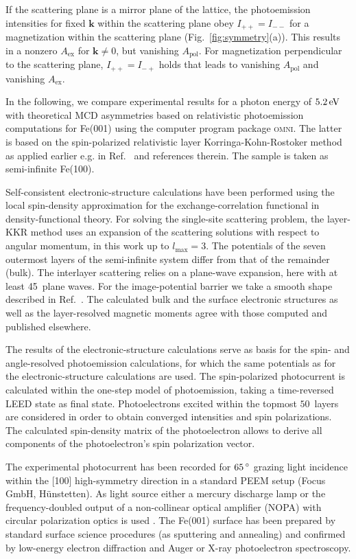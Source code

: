 \documentclass[prl,twocolumn,floatfix,superscriptaddress,aps]{revtex4-2}
\renewcommand{\vec}[1]{\boldsymbol{#1}}
\begin{document}
If the scattering plane is a mirror plane of the lattice, the photoemission intensities for fixed $\vec{k}$ within the scattering plane obey $I_{+ +} = I_{- -}$ for a magnetization within the scattering plane (Fig.~\ref{fig:symmetry}(a)). This results in a nonzero $A_{\mathrm{ex}}$ for $\vec{k}\neq 0$, but vanishing $A_{\mathrm{pol}}$. For magnetization perpendicular to the scattering plane, $I_{+ +} = I_{- +}$ holds that leads to vanishing $A_{\mathrm{pol}}$ and vanishing $A_{\mathrm{ex}}$.
 

In the following, we compare experimental results for a photon energy of $\unit[5.2]{eV}$ with theoretical MCD asymmetries based on relativistic photoemission computations for Fe(001) using the computer program package \textsc{omni}. 
The latter is based on the spin-polarized relativistic layer Korringa-Kohn-Rostoker method as applied earlier e.g. in Ref.~ and references therein. The sample is taken as semi-infinite Fe(100).

Self-consistent electronic-structure calculations have been performed using the local spin-density approximation for the exchange-correlation functional in density-functional theory. For solving the single-site scattering problem, the layer-KKR method uses an expansion of the scattering solutions with respect to angular momentum, in this work up to $l_{\mathrm{max}} = 3$. The potentials of the seven outermost layers of the semi-infinite system differ from that of the remainder (bulk). The interlayer scattering relies on a plane-wave expansion, here with at least 45~plane waves. For the image-potential barrier we take a smooth shape described in Ref.~. The calculated bulk and the surface electronic structures as well as the layer-resolved magnetic moments agree with those computed and published elsewhere. 

The results of the electronic-structure calculations serve as basis for the spin- and angle-resolved photoemission calculations, for which the same potentials as for the electronic-structure calculations are used. The spin-polarized photocurrent is calculated within the one-step model of photoemission, taking a time-reversed LEED state as final state. Photoelectrons excited within the topmost $50$~layers are considered in order to obtain converged intensities and spin polarizations. The calculated spin-density matrix of the photoelectron allows to derive all components of the photoelectron's spin polarization vector.


The experimental photocurrent has been recorded for $\unit[65]{^{\circ}}$ grazing light incidence within the [100] high-symmetry direction in a standard PEEM setup (Focus GmbH, H\"{u}nstetten). As light source either a mercury discharge lamp or the frequency-doubled output of a non-collinear optical amplifier (NOPA) with circular polarization optics is used \cite{duncker2012,gillmeister2020, paleschke2021}. The Fe(001) surface has been prepared by standard surface science procedures (as sputtering and annealing) and confirmed by low-energy electron diffraction and Auger or X-ray photoelectron spectroscopy.
\end{document}
